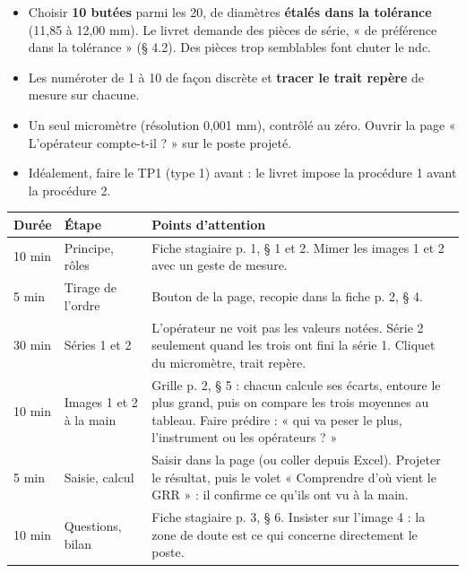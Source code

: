 \documentclass[10pt,a4paper]{article}
\begin{document}
\thispagestyle{fancy}

\begin{itemize}
\item Choisir \textbf{10 butées} parmi les 20, de diamètres \textbf{étalés dans la tolérance} (11,85 à 12,00 mm). Le livret demande des pièces de série, « de préférence dans la tolérance » (§ 4.2). Des pièces trop semblables font chuter le ndc.
\item Les numéroter de 1 à 10 de façon discrète et \textbf{tracer le trait repère} de mesure sur chacune.
\item Un seul micromètre (résolution 0,001 mm), contrôlé au zéro. Ouvrir la page « L'opérateur compte-t-il ? » sur le poste projeté.
\item Idéalement, faire le TP1 (type 1) avant : le livret impose la procédure 1 avant la procédure 2.
\end{itemize}

\renewcommand{\arraystretch}{1.25}
\begin{tabularx}{\linewidth}{@{}l l X@{}}
\toprule
\textbf{Durée} & \textbf{Étape} & \textbf{Points d'attention}\\\midrule
10 min & Principe, rôles & Fiche stagiaire p. 1, § 1 et 2. Mimer les images 1 et 2 avec un geste de mesure.\\
5 min & Tirage de l'ordre & Bouton de la page, recopie dans la fiche p. 2, § 4.\\
30 min & Séries 1 et 2 & L'opérateur ne voit pas les valeurs notées. Série 2 seulement quand les trois ont fini la série 1. Cliquet du micromètre, trait repère.\\
10 min & Images 1 et 2 à la main & Grille p. 2, § 5 : chacun calcule ses écarts, entoure le plus grand, puis on compare les trois moyennes au tableau. Faire prédire : « qui va peser le plus, l'instrument ou les opérateurs ? »\\
5 min & Saisie, calcul & Saisir dans la page (ou coller depuis Excel). Projeter le résultat, puis le volet « Comprendre d'où vient le GRR » : il confirme ce qu'ils ont vu à la main.\\
10 min & Questions, bilan & Fiche stagiaire p. 3, § 6. Insister sur l'image 4 : la zone de doute est ce qui concerne directement le poste.\\
\bottomrule
\end{tabularx}
\end{document}
